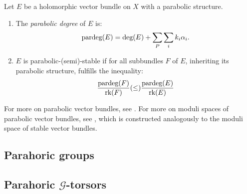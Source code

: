 \begin{definition}
    Let $E$ be a holomorphic vector bundle on $X$ with a parabolic structure.
    \begin{enumerate}[label=(\alph*)]
        \item The \textit{parabolic degree} of $E$ is:
              \begin{equation}
                  \text{pardeg}(E)=\text{deg}(E)+\sum_P\sum_ik_i\alpha_i.
              \end{equation}
        \item $E$ is parabolic-(semi)-stable if for all subbundles $F$ of $E$, inheriting its parabolic structure, fulfills the inequality:
        \begin{equation}
            \frac{\text{pardeg}(F)}{\text{rk}(F)}(\leq)\frac{\text{pardeg}(E)}{\text{rk}(E)}
        \end{equation}
    \end{enumerate}
\end{definition}

For more on parabolic vector bundles, see \cite[Section 2.1]{logmar}. For more on moduli spaces of parabolic vector bundles, see \cite[Section 4]{mehtasesh}, which is constructed analogously to the moduli space of stable vector bundles.

\subsection{Parahoric groups}



\subsection{Parahoric $\mathcal{G}$-torsors}